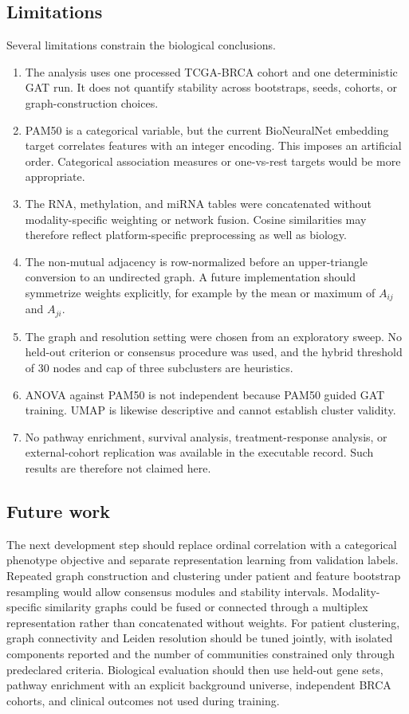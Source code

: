 \documentclass[11pt]{article}
\begin{document}
\subsection{Limitations}

Several limitations constrain the biological conclusions.
\begin{enumerate}
    \item The analysis uses one processed TCGA-BRCA cohort and one deterministic GAT run. It does not quantify stability across bootstraps, seeds, cohorts, or graph-construction choices.
    \item PAM50 is a categorical variable, but the current BioNeuralNet embedding target correlates features with an integer encoding. This imposes an artificial order. Categorical association measures or one-vs-rest targets would be more appropriate.
    \item The RNA, methylation, and miRNA tables were concatenated without modality-specific weighting or network fusion. Cosine similarities may therefore reflect platform-specific preprocessing as well as biology.
    \item The non-mutual adjacency is row-normalized before an upper-triangle conversion to an undirected graph. A future implementation should symmetrize weights explicitly, for example by the mean or maximum of $A_{ij}$ and $A_{ji}$.
    \item The graph and resolution setting were chosen from an exploratory sweep. No held-out criterion or consensus procedure was used, and the hybrid threshold of 30 nodes and cap of three subclusters are heuristics.
    \item ANOVA against PAM50 is not independent because PAM50 guided GAT training. UMAP is likewise descriptive and cannot establish cluster validity.
    \item No pathway enrichment, survival analysis, treatment-response analysis, or external-cohort replication was available in the executable record. Such results are therefore not claimed here.
\end{enumerate}

\subsection{Future work}

The next development step should replace ordinal correlation with a categorical phenotype objective and separate representation learning from validation labels. Repeated graph construction and clustering under patient and feature bootstrap resampling would allow consensus modules and stability intervals. Modality-specific similarity graphs could be fused or connected through a multiplex representation rather than concatenated without weights. For patient clustering, graph connectivity and Leiden resolution should be tuned jointly, with isolated components reported and the number of communities constrained only through predeclared criteria. Biological evaluation should then use held-out gene sets, pathway enrichment with an explicit background universe, independent BRCA cohorts, and clinical outcomes not used during training.
\end{document}

